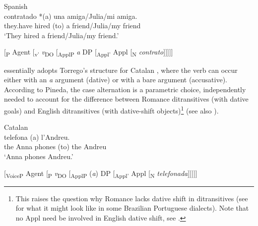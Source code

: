 \documentclass[output=paper,colorlinks,citecolor=brown,modfonts,nonflat]{langsci/langscibook}
\begin{document}
\ea%
    \label{ex:manzini:2}
    Spanish \citep{Torrego2010}\\
         {contratado}  {*(a)} {una} {amiga/Julia/mi} {amiga.}\\
        they.have   hired      (to) a friend/Julia/my friend\\
    \glt ‘They hired a friend/Julia/my friend.’
\z

\ea%
    \label{ex:manzini:3}{}
    [\textsubscript{{\liv}P} Agent [\textsubscript{v’} \textit{v}\textsubscript{DO} [\textsubscript{ApplP} \textit{a} DP [\textsubscript{Appl’} Appl [\textsubscript{N} \textit{contrato}]]]]]
\z

\citet[359--360]{Pineda2016} essentially adopts Torrego’s structure for Catalan , where the verb can occur either with an \textit{a} argument (dative) or with a bare argument (accusative). According to Pineda, the case alternation is a parametric choice, independently needed to account for the difference between Romance ditransitives (with dative goals) and English ditransitives (with dative-shift objects)\footnote{This raises the question why Romance lacks dative shift in ditransitives (see \citealt{Lima-Salles2016} for what it might look like in some Brazilian Portuguese dialects). Note that no Appl need be involved in English dative shift, see \citet{Kayne1984, Pesetsky1995, Harley2002, BeckJohnson2004}.} (see also \citealt{Pineda2014}).

\ea%
    \label{ex:manzini:4}
    Catalan \citep{Pineda2016}\\
       {telefona}   {(a)} {l’Andreu}.\\
        {the Anna}   phones   (to) {the Andreu}\\
    \glt ‘Anna phones Andreu.’
\z

\ea%
    \label{ex:manzini:5}{}
    [\textsubscript{VoiceP}  Agent [\textsubscript{{\liv}P} \textit{v}\textsubscript{DO} [\textsubscript{ApplP} (\textit{a}) DP [\textsubscript{Appl’} Appl [\textsubscript{N} \textit{telefonada}]]]]]\\
\z
\end{document}
